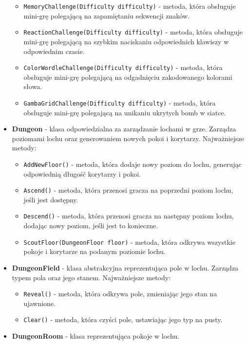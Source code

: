 \begin{itemize}
\begin{itemize}
                \item \texttt{MemoryChallenge(Difficulty difficulty)} - metoda, która obsługuje mini-grę polegającą na zapamiętaniu sekwencji znaków.
                \item \texttt{ReactionChallenge(Difficulty difficulty)} - metoda, która obsługuje mini-grę polegającą na szybkim naciskaniu odpowiednich klawiszy w odpowiednim czasie.
                \item \texttt{ColorWordleChallenge(Difficulty difficulty)} - metoda, która obsługuje mini-grę polegającą na odgadnięciu zakodowanego kolorami słowa.
                \item \texttt{GambaGridChallenge(Difficulty difficulty)} - metoda, która obsługuje mini-grę polegającą na unikaniu ukrytych bomb w siatce.
            \end{itemize}
        \item \textbf{Dungeon} - klasa odpowiedzialna za zarządzanie lochami w grze. 
        Zarządza poziomami lochu oraz generowaniem nowych pokoi i korytarzy. Najważniejsze metody:
            \begin{itemize}
                \item \texttt{AddNewFloor()} - metoda, która dodaje nowy poziom do lochu, generując odpowiednią długość korytarzy i pokoi.
                \item \texttt{Ascend()} - metoda, która przenosi gracza na poprzedni poziom lochu, jeśli jest dostępny.
                \item \texttt{Descend()} - metoda, która przenosi gracza na następny poziom lochu, dodając nowy poziom, jeśli jest to konieczne.
                \item \texttt{ScoutFloor(DungeonFloor floor)} - metoda, która odkrywa wszystkie pokoje i korytarze na podanym poziomie lochu.
            \end{itemize}
        \item \textbf{DungeonField} - klasa abstrakcyjna reprezentująca pole w lochu. 
        Zarządza typem pola oraz jego stanem. Najważniejsze metody:
            \begin{itemize}
                \item \texttt{Reveal()} - metoda, która odkrywa pole, zmieniając jego stan na ujawnione.
                \item \texttt{Clear()} - metoda, która czyści pole, ustawiając jego typ na pusty.
            \end{itemize}
        \item \textbf{DungeonRoom} - klasa reprezentująca pokoje w lochu. 

\end{itemize}
